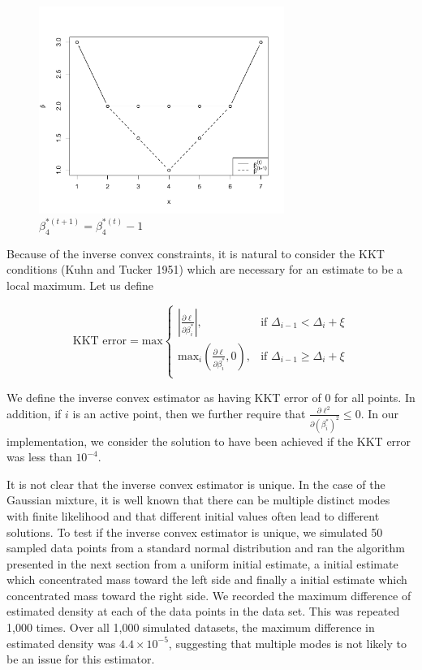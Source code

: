 \documentclass[11pt]{article}
\numberwithin{equation}{section}
\begin{document}
	
	\begin{figure}[h]
	\centerline{\includegraphics[width = 8cm]{ActivePoint2.pdf}}
	\caption[Active Set Parameterization: Inverse Convex]{$\beta_4^{*(t+1)} = \beta_4^{*(t) }-1$}
	\end{figure}		
	
 Because of the inverse convex constraints, it is natural to consider the KKT conditions (Kuhn and Tucker 1951) which are necessary for an estimate to be a local maximum. Let us define
	
	\[
	\text{KKT error} = {\text{max}} 
	\begin{cases}
		|\frac{\partial \ell } {\partial \beta_i^*}|, & \text{if } \Delta_{i-1} < \Delta_{i} + \xi \\
		\text{max}_i(\frac{\partial \ell}{\partial \beta_i^*},0 ) , & \text{if } \Delta_{i-1} \geq \Delta_i + \xi \\  
	\end{cases}
	\]
	
	We define the inverse convex estimator as having KKT error of 0 for all points. In addition, if $i$ is an active point, then we further require that $\frac{\partial \ell^2 } {\partial (\beta_i^*)^2} \leq 0$. In our implementation, we consider the solution to have been achieved if the KKT error was less than $10^{-4}$. 
	
	It is not clear that the inverse convex estimator is unique. In the case of the Gaussian mixture, it is well known that there can be multiple distinct modes with finite likelihood and that different initial values often lead to different solutions. To test if the inverse convex estimator is unique, we simulated 50 sampled data points from a standard normal distribution and ran the algorithm presented in the next section from a uniform initial estimate, a initial estimate which concentrated mass toward the left side and finally a initial estimate which concentrated mass toward the right side. We recorded the maximum difference of estimated density at each of the data points in the data set. This was repeated 1,000 times. Over all 1,000 simulated datasets, the maximum difference in estimated density was $4.4 \times 10^{-5}$, suggesting that multiple modes is not likely to be an issue for this estimator. 
	
\end{document}
